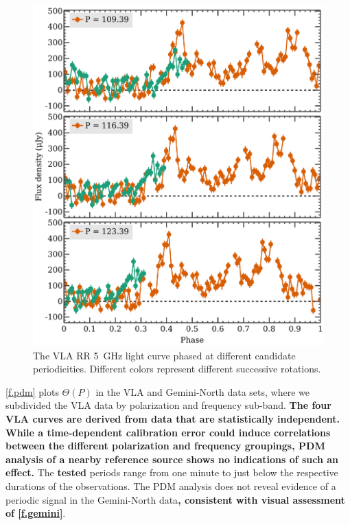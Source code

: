 \documentclass[twocolumn, times]{aastex6}
\begin{document}
\begin{figure}[tbp]
  \includegraphics[width=\linewidth]{phased}
  \caption{The VLA RR 5~GHz light curve phased at different candidate
    periodicities. Different colors represent different successive rotations.}
  \label{f.phased}
\end{figure}


\autoref{f.pdm} plots $\Theta(P)$ in the VLA and Gemini-North data sets, where
we subdivided the VLA data by polarization and frequency sub-band. \textbf{The
  four VLA curves are derived from data that are statistically independent.
  While a time-dependent calibration error could induce correlations between
  the different polarization and frequency groupings, PDM analysis of a nearby
  reference source shows no indications of such an effect.} The
\textbf{tested} periods range from one minute to just below the respective
durations of the observations. The PDM analysis does not reveal evidence of a
periodic signal in the Gemini-North data\textbf{, consistent with visual
  assessment of \autoref{f.gemini}}.
\end{document}

